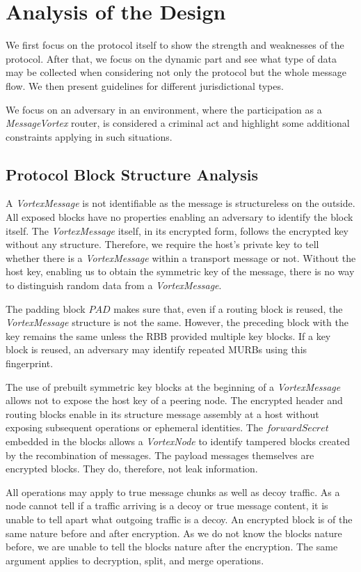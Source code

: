 \documentclass[acmsmall, screen, final]{acmart}
\begin{document}
	\section{Analysis of the Design\label{sec:discussion}}
	We first focus on the protocol itself to show the strength and weaknesses of the protocol. After that, we focus on the dynamic part and see what type of data may be collected when considering not only the protocol but the whole message flow. We then present guidelines for different jurisdictional types.
	
	We focus on an adversary in an environment, where the participation as a \emph{MessageVortex} router, is considered a criminal act and highlight some additional constraints applying in such situations.
	
	\subsection{Protocol Block Structure Analysis\label{sec:staticAnalysis}}
	A \emph{VortexMessage} is not identifiable as the message is structureless on the outside. All exposed blocks have no properties enabling an adversary to identify the block itself. The \emph{VortexMessage} itself, in its encrypted form, follows the encrypted key without any structure. Therefore, we require the host's private key to tell whether there is a \emph{VortexMessage} within a transport message or not. Without the host key, enabling us to obtain the symmetric key of the message, there is no way to distinguish random data from a \emph{VortexMessage}.
	
	The padding block $PAD$ makes sure that, even if a routing block is reused, the \emph{VortexMessage} structure is not the same. However, the preceding block with the key remains the same unless the RBB provided multiple key blocks. If a key block is reused, an adversary may identify repeated MURBs using this fingerprint.
	
	The use of prebuilt symmetric key blocks at the beginning of a \emph{VortexMessage} allows not to expose the host key of a peering node. The encrypted header and routing blocks enable in its structure message assembly at a host without exposing subsequent operations or ephemeral identities. The $forwardSecret$ embedded in the blocks allows a \emph{VortexNode} to identify tampered blocks created by the recombination of messages. The payload messages themselves are encrypted blocks. They do, therefore, not leak information.
	
	All operations may apply to true message chunks as well as decoy traffic. As a node cannot tell if a traffic arriving is a decoy or true message content, it is unable to tell apart what outgoing traffic is a decoy. An encrypted block is of the same nature before and after encryption. As we do not know the blocks nature before, we are unable to tell the blocks nature after the encryption. The same argument applies to decryption, split, and merge operations. 
	
\end{document}
